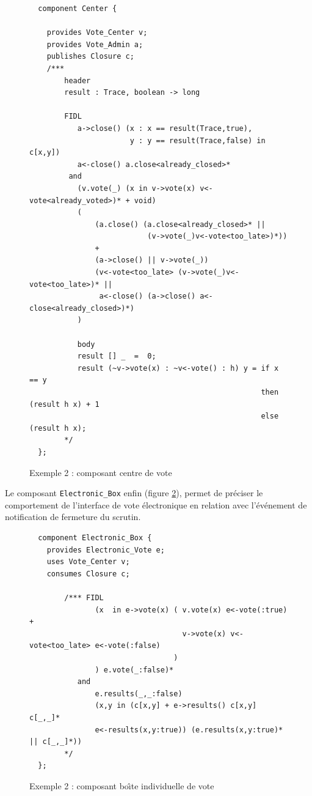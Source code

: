\begin{figure}[htbp]
    \centering
\begin{lstlisting}
  component Center { 
    
    provides Vote_Center v;
    provides Vote_Admin a;
    publishes Closure c;
    /***
        header
        result : Trace, boolean -> long

        FIDL
           a->close() (x : x == result(Trace,true), 
                       y : y == result(Trace,false) in c[x,y])
           a<-close() a.close<already_closed>*
         and 
           (v.vote(_) (x in v->vote(x) v<-vote<already_voted>)* + void)
           (
               (a.close() (a.close<already_closed>* || 
                           (v->vote(_)v<-vote<too_late>)*)) 
               +            
               (a->close() || v->vote(_)) 
               (v<-vote<too_late> (v->vote(_)v<-vote<too_late>)* ||
                a<-close() (a->close() a<-close<already_closed>)*)
           )
            
           body
           result [] _  =  0;
           result (~v->vote(x) : ~v<-vote() : h) y = if x == y 
                                                     then (result h x) + 1 
                                                     else (result h x);
        */
  };
\end{lstlisting}
        \caption{Exemple 2 : composant centre de vote}
    \label{fig-excenter}
\end{figure}

Le composant \texttt{Electronic\_Box} enfin (figure
\ref{fig-exevote}), permet de pr\'eciser le comportement de
l'interface de vote \'electronique en relation avec l'\'ev\'enement
de notification de fermeture du scrutin. 

\begin{figure}[htbp]
    \centering
\begin{lstlisting}
  component Electronic_Box {
    provides Electronic_Vote e;
    uses Vote_Center v;
    consumes Closure c;
        
        /*** FIDL
               (x  in e->vote(x) ( v.vote(x) e<-vote(:true) + 
                                   v->vote(x) v<-vote<too_late> e<-vote(:false)
                                 )
               ) e.vote(_:false)*
           and 
               e.results(_,_:false)
               (x,y in (c[x,y] + e->results() c[x,y] c[_,_]*
               e<-results(x,y:true)) (e.results(x,y:true)* || c[_,_]*))
        */
  };
\end{lstlisting}
        \caption{Exemple 2 : composant bo\^{\i}te individuelle de
           vote }
    \label{fig-exevote}
\end{figure}


